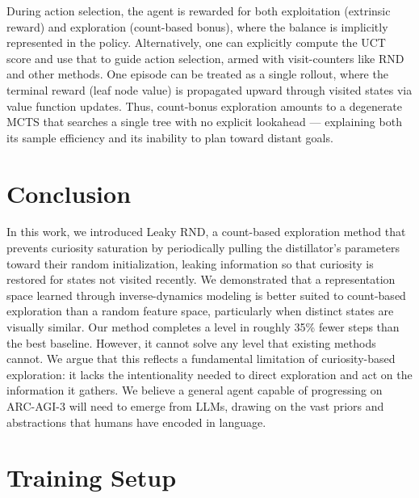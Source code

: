\documentclass{article}
\begin{document}
During action selection, the agent is rewarded for both exploitation (extrinsic reward) and exploration (count-based bonus), where the balance is implicitly represented in the policy. Alternatively, one can explicitly compute the UCT score and use that to guide action selection, armed with visit-counters like RND and other methods. One episode can be treated as a single rollout, where the terminal reward (leaf node value) is propagated upward through visited states via value function updates. Thus, count-bonus exploration amounts to a degenerate MCTS that searches a single tree with no explicit lookahead --- explaining both its sample efficiency and its inability to plan toward distant goals.

\section{Conclusion}
In this work, we introduced Leaky RND, a count-based exploration method that prevents curiosity saturation by periodically pulling the distillator's parameters toward their random initialization, leaking information so that curiosity is restored for states not visited recently. We demonstrated that a representation space learned through inverse-dynamics modeling is better suited to count-based exploration than a random feature space, particularly when distinct states are visually similar. Our method completes a level in roughly 35\% fewer steps than the best baseline. However, it cannot solve any level that existing methods cannot. We argue that this reflects a fundamental limitation of curiosity-based exploration: it lacks the intentionality needed to direct exploration and act on the information it gathers. We believe a general agent capable of progressing on ARC-AGI-3 will need to emerge from LLMs, drawing on the vast priors and abstractions that humans have encoded in language.




\appendix

\section{Training Setup}
\label{app:training}
\end{document}
